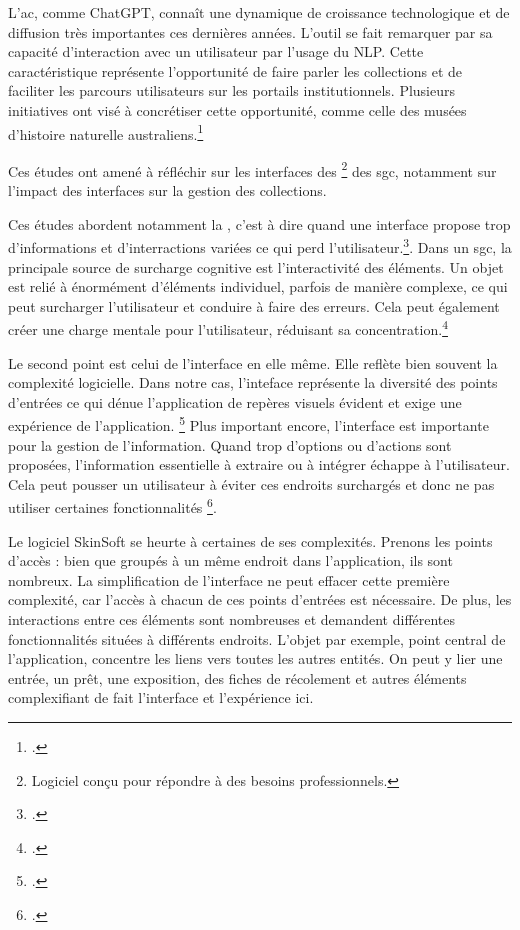 L'\gls{ac}, comme ChatGPT, connaît une dynamique de croissance technologique et de diffusion très importantes ces dernières années. L'outil se fait remarquer par sa capacité d'interaction avec un utilisateur par l'usage du \gls{NLP}. Cette caractéristique représente l'opportunité de faire parler les collections et de faciliter les parcours utilisateurs sur les portails institutionnels. Plusieurs initiatives ont visé à concrétiser cette opportunité, comme celle des musées d'histoire naturelle australiens.\footcite{wangConversationalAIEnhancedExploration2026} 
	
Ces études ont amené à réfléchir sur les interfaces des \footnote{Logiciel conçu pour répondre à des besoins professionnels.} des \gls{sgc}, notamment sur l'impact des interfaces sur la gestion des collections. 
	
\label{cognitif} Ces études abordent notamment la , c'est à dire quand une interface propose trop d'informations et d'interractions variées ce qui perd l'utilisateur.\footcite[p.1-4]{paasCognitiveLoadTheory2010}. Dans un \gls{sgc}, la principale source de surcharge cognitive est l'interactivité des éléments. Un objet est relié à énormément d'éléments individuel, parfois de manière complexe, ce qui peut surcharger l'utilisateur et conduire à faire des erreurs. Cela peut également créer une charge mentale pour l'utilisateur, réduisant sa concentration.\footcite[p.2]{paasCognitiveLoadTheory2010}
	
Le second point est celui de l'interface en elle même. Elle reflète bien souvent la complexité logicielle. Dans notre cas, l'inteface représente la diversité des points d'entrées ce qui dénue l'application de repères visuels évident et exige une expérience de l'application. \footcite[p.153]{nielsenEnhancingExplanatoryPower1994} Plus important encore, l'interface est importante pour la gestion de l'information. Quand trop d'options ou d'actions sont proposées, l'information essentielle à extraire ou à intégrer échappe à l'utilisateur. Cela peut pousser un utilisateur à éviter ces endroits surchargés et donc ne pas utiliser certaines fonctionnalités \footcite[p.153-154]{nielsenEnhancingExplanatoryPower1994}.\newline
	
Le logiciel SkinSoft se heurte à certaines de ses complexités. Prenons les points d'accès : bien que groupés à un même endroit dans l'application, ils sont nombreux. La simplification de l'interface ne peut effacer cette première complexité, car l'accès à chacun de ces points d'entrées est nécessaire. De plus, les interactions entre ces éléments sont nombreuses et demandent différentes fonctionnalités situées à différents endroits. L'objet par exemple, point central de l'application, concentre les liens vers toutes les autres entités. On peut y lier une entrée, un prêt, une exposition, des fiches de récolement et autres éléments complexifiant de fait l'interface et l'expérience ici.

